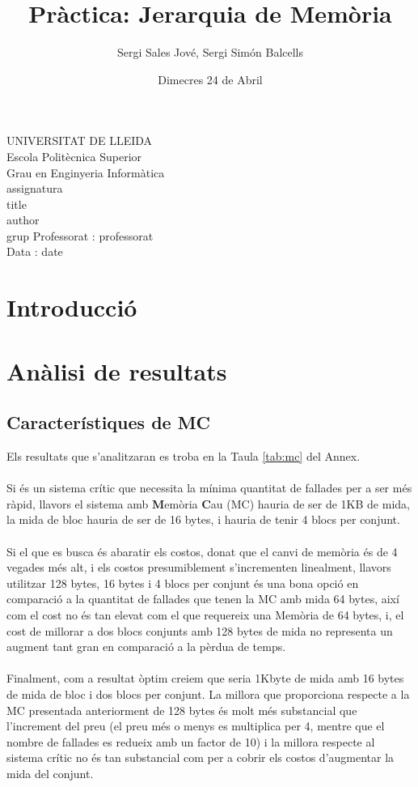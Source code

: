 \documentclass{article}
\title{Pràctica: Jerarquia de Memòria}
\author{Sergi Sales Jové, Sergi Simón Balcells}
\date{Dimecres 24 de Abril}
\renewcommand{\maketitle}{ %
    \begin{titlepage}
        \raggedright{UNIVERSITAT DE LLEIDA \\
            Escola Politècnica Superior \\
            Grau en Enginyeria Informàtica\\
            \1assignatura\\}
            \vspace{5cm}
            \centering\huge{\5title \\}
            \vspace{3cm}
            \large{\6author} \\
            \normalsize{\3grup}
            \vfill
            Professorat : \4professorat \\
            Data : \7date
\end{titlepage}}
\begin{document}
\maketitle
\thispagestyle{empty}

\newpage
{}
\tableofcontents
\newpage
{}
\section{Introducció}

\section{Anàlisi de resultats}

\subsection{Característiques de MC}
Els resultats que s'analitzaran es troba en la Taula \ref{tab:mc} del Annex.\\
\\
Si és un sistema crític que necessita la mínima quantitat de fallades per a ser més
ràpid, llavors el sistema amb \textbf{M}emòria \textbf{C}au (MC) hauria de ser de 1KB
de mida, la mida de bloc hauria de ser de 16 bytes, i hauria de tenir 4 blocs per conjunt.\\
\\
Si el que es busca és abaratir els costos, donat que el canvi de memòria és de 4 vegades més
alt, i els costos presumiblement s'incrementen linealment, llavors utilitzar 128 bytes, 16 bytes i
4 blocs per conjunt és una bona opció en comparació a la quantitat de fallades que tenen la MC amb
mida 64 bytes, així com el cost no és tan elevat com el que requereix una Memòria de 64 bytes,
i, el cost de millorar a dos blocs conjunts amb 128 bytes de mida no representa un augment tant gran
en comparació a la pèrdua de temps.\\
\\
Finalment, com a resultat òptim creiem que seria 1Kbyte de mida amb 16 bytes de mida de bloc i
dos blocs per conjunt. La millora que proporciona respecte a la MC presentada anteriorment de 128 bytes
és molt més substancial que l'increment del preu (el preu més o menys es multiplica per 4, mentre que
el nombre de fallades es redueix amb un factor de 10) i la millora respecte al sistema crític no
és tan substancial com per a cobrir els costos d'augmentar la mida del conjunt.
\end{document}
